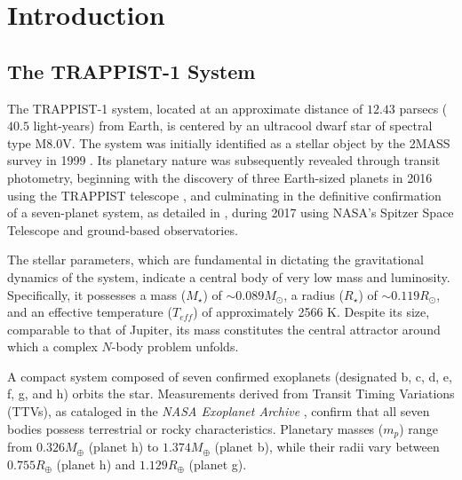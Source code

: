 \documentclass{aa}
\begin{document}

   \maketitle


\nolinenumbers
\section{Introduction}
\subsection{The TRAPPIST-1 System}

The TRAPPIST-1 system, located at an approximate distance of $12.43$ parsecs ($40.5$ light-years) from Earth, is centered by an ultracool dwarf star of spectral type M8.0V. The system was initially identified as a stellar object by the 2MASS survey in 1999 \citep{1999AAS...195.3401S}. Its planetary nature was subsequently revealed through transit photometry, beginning with the discovery of three Earth-sized planets in 2016 \citep{2016Natur.533..221G} using the TRAPPIST telescope \citep{2013EPSC....8..968J}, and culminating in the definitive confirmation of a seven-planet system, as detailed in \citet{2017Natur.542..456G}, during 2017 using NASA's Spitzer Space Telescope \citep{2007RScI...78a1302G} and ground-based observatories.

The stellar parameters, which are fundamental in dictating the gravitational dynamics of the system, indicate a central body of very low mass and luminosity. Specifically, it possesses a mass ($M_\star$) of $\sim 0.089 M_{\odot}$, a radius ($R_\star$) of $\sim 0.119 R_{\odot}$, and an effective temperature ($T_{eff}$) of approximately 2566 K. Despite its size, comparable to that of Jupiter, its mass constitutes the central attractor around which a complex $N$-body problem unfolds.

A compact system composed of seven confirmed exoplanets (designated b, c, d, e, f, g, and h) orbits the star. Measurements derived from Transit Timing Variations (TTVs), as cataloged in the \textit{NASA Exoplanet Archive} \citep{2013PASP..125..989A}, confirm that all seven bodies possess terrestrial or rocky characteristics. Planetary masses ($m_p$) range from $0.326 M_{\oplus}$ (planet h) to $1.374 M_{\oplus}$ (planet b), while their radii vary between $0.755 R_{\oplus}$ (planet h) and $1.129 R_{\oplus}$ (planet g).
\end{document}
